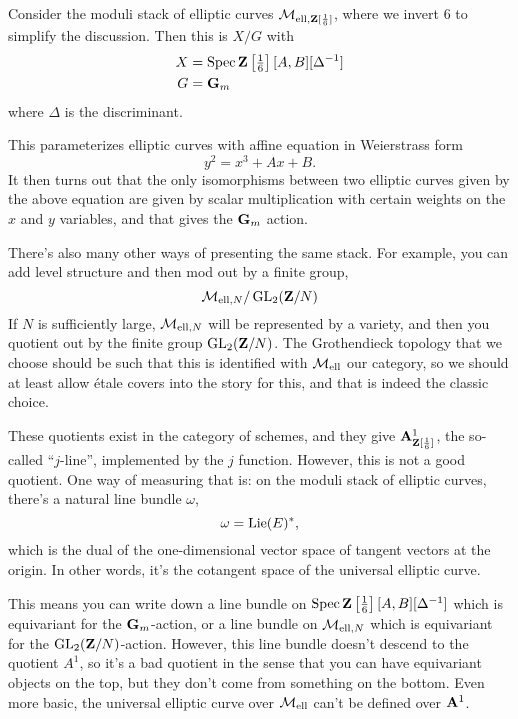 \begin{example}
  Consider the moduli stack of elliptic curves $\mathcal M_{\text{ell},\mathbf Z[\frac16]}$, where we invert $6$ to simplify the discussion. Then this is $X/G$ with
  \begin{align*}
    X &= \operatorname{Spec}\mathbf Z\left[\tfrac16\right][A,B][\Delta^{-1}]\\
    G &= \mathbf G_m
  \end{align*}
  where $\Delta$ is the discriminant.

  This parameterizes elliptic curves with affine equation in Weierstrass form
  \[ y^2 = x^3 + Ax + B. \]
  It then turns out that the only isomorphisms between two elliptic curves given by the above equation are given by scalar multiplication with certain weights on the $x$ and $y$ variables, and that gives the $\mathbf G_m$ action.

  There's also many other ways of presenting the same stack. For example, you can add level structure and then mod out by a finite group,
  \[
    \mathcal M_{\text{ell},N} / \operatorname{GL}_2(\mathbf Z/N)
  \]
  If $N$ is sufficiently large, $\mathcal M_{\text{ell},N}$ will be represented by a variety, and then you quotient out by the finite group $\operatorname{GL}_2(\mathbf Z/N)$. The Grothendieck topology that we choose should be such that this is identified with $\mathcal M_{\text{ell}}$ our category, so we should at least allow \'etale covers into the story for this, and that is indeed the classic choice.

  These quotients exist in the category of schemes, and they give $\mathbf A^1_{\mathbf Z[\frac16]}$, the so-called ``$j$-line'', implemented by the $j$ function. However, this is not a good quotient. One way of measuring that is: on the moduli stack of elliptic curves, there's a natural line bundle $\omega$,
  \[ \omega = \operatorname{Lie}(E)^*, \]
  which is the dual of the one-dimensional vector space of tangent vectors at the origin. In other words, it's the cotangent space of the universal elliptic curve.

  This means you can write down a line bundle on $\operatorname{Spec}\mathbf Z\left[\tfrac16\right][A,B][\Delta^{-1}]$ which is equivariant for the $\mathbf G_m$-action, or a line bundle on $\mathcal M_{\text{ell},N}$ which is equivariant for the $\operatorname{GL}_2(\mathbf Z/N)$-action. However, this line bundle doesn't descend to the quotient $A^1$, so it's a bad quotient in the sense that you can have equivariant objects on the top, but they don't come from something on the bottom. Even more basic, the universal elliptic curve over $\mathcal M_{\text{ell}}$ can't be defined over $\mathbf A^1$.
\end{example}

